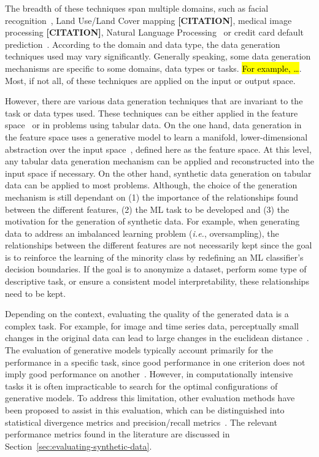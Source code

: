 \documentclass[parskip=full]{scrartcl}
\begin{document}
The breadth of these techniques span multiple domains, such as facial
recognition~\cite{lv2017data}, Land Use/Land Cover mapping
\textbf{[CITATION]}, medical image processing \textbf{[CITATION]}, Natural
Language Processing~\cite{feng2021survey} or credit card default
prediction~\cite{alam2020investigation}. According to the domain and data
type, the data generation techniques used may vary significantly. Generally
speaking, some data generation mechanisms are specific to some domains, data
types or tasks. \hl{For example, \ldots}. Most, if not all, of these
techniques are applied on the input or output space.

However, there are various data generation techniques that are invariant to
the task or data types used. These techniques can be either applied in the
feature space~\cite{devries2017dataset} or in problems using tabular data. On
the one hand, data generation in the feature space uses a generative model to
learn a manifold, lower-dimensional abstraction over the input
space~\cite{kingma2019introduction}, defined here as the feature space. At
this level, any tabular data generation mechanism can be applied and
reconstructed into the input space if necessary. On the other hand, synthetic
data generation on tabular data can be applied to most problems. Although, the
choice of the generation mechanism is still dependant on (1) the importance of
the relationships found between the different features, (2) the ML task to be
developed and (3) the motivation for the generation of synthetic data. For
example, when generating data to address an imbalanced learning problem
(\textit{i.e.}, oversampling), the relationships between the different
features are not necessarily kept since the goal is to reinforce the learning
of the minority class by redefining an ML classifier's decision boundaries. If
the goal is to anonymize a dataset, perform some type of descriptive task, or
ensure a consistent model interpretability, these relationships need to be
kept.

Depending on the context, evaluating the quality of the generated data is a
complex task. For example, for image and time series data, perceptually small
changes in the original data can lead to large changes in the euclidean
distance~\cite{assefa2020generating, theis2016note}. The evaluation of
generative models typically account primarily for the performance in a
specific task, since good performance in one criterion does not imply good
performance on another~\cite{theis2016note}. However, in computationally
intensive tasks it is often impracticable to search for the optimal
configurations of generative models. To address this limitation, other
evaluation methods have been proposed to assist in this evaluation, which can
be distinguished into statistical divergence metrics and precision/recall
metrics~\cite{alaa2022faithful}. The relevant performance metrics found in the
literature are discussed in Section~\ref{sec:evaluating-synthetic-data}.
\end{document}
